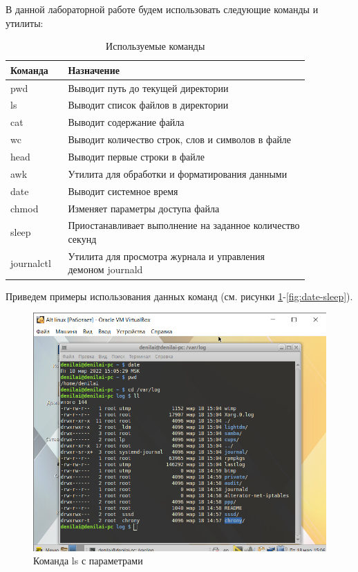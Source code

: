 \documentclass[a4paper,14pt]{extarticle}
\begin{document}
В данной лабораторной работе будем использовать следующие команды и утилиты:
\begin{table}[h!]
	\small
	\centering
	\label{tab:commands}
	\caption{Используемые команды}
	\begin{tabular}{|p{0.16\linewidth}|p{0.7\linewidth}|}
		\hline
		\textbf{Команда} & \textbf{Назначение} \\\hline
		pwd & Выводит путь до текущей директории \\\hline
		ls & Выводит список файлов в директории \\\hline
		cat & Выводит содержание файла \\\hline
		wc & Выводит количество строк,  слов и символов в файле \\\hline
		head & Выводит первые строки в файле \\\hline
		awk & Утилита для обработки и форматирования данными \\\hline
		date & Выводит системное время \\\hline
		chmod & Изменяет параметры доступа файла \\\hline
		sleep & Приостанавливает выполнение на заданное количество секунд \\\hline 
		journalctl & Утилита для просмотра журнала и управления демоном journald \\\hline
	\end{tabular}
\end{table}
\clearpage

Приведем примеры использования данных команд (см. рисунки \ref{fig:ls}-\ref{fig:date-sleep}).
\begin{figure}[h!]
	\centering
	\includegraphics[width=0.7\linewidth]{"images/Практика МИРЭА/Alt linux [Работает] - Oracle VM VirtualBox 18.03.2022 15_06_31"}
	\caption{Команда ls с параметрами}
	\label{fig:ls}
\end{figure}
\end{document}
